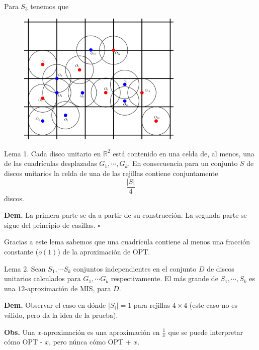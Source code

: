 \begin{frame}
  Para $S_3$ tenemos que
  \begin{figure}  
    \centering
    \includegraphics[width=0.7\textwidth]{./Images/R3.png}
  \end{figure}
\end{frame}

\begin{frame}
  \begin{block}{Lema 1.}
    Cada disco unitario en $\mathbb{R}^2$ está contenido en una celda de, al menos, una de las
    cuadrículas desplazadas $G_1, \dotsm, G_k$. En consecuencia para un conjunto $S$ de discos
    unitarios la celda de una de las rejillas contiene conjuntamente
    \[\frac{|S|}{4}\]
    discos.
  \end{block}
  \textbf{Dem.} La primera parte se da a partir de su construcción. La segunda parte se sigue
  del principio de casillas. \hfill $\square$\newline

  Gracias a este lema sabemos que una cuadrícula contiene al menos una fracción constante
  ($o(1)$) de la aproximación de OPT.
\end{frame}


\begin{frame}
  \begin{block}{Lema 2.}
    Sean $S_1, \dotsm S_k$ conjuntos independientes en el conjunto $D$ de discos unitarios
    calculados para $G_1, \dotsm G_k$ respectivamente. El más grande de $S_1, \dotsm,S_k$
    es una $12$-aproximación de MIS, para $D$.
  \end{block}
  \textbf{Dem.} Observar el caso en dónde $|S_i| = 1$ para rejillas $4 \times 4$ (este caso
  no es válido, pero da la idea de la prueba).\newline

  \textbf{Obs.} Una $x$-aproximación es una aproximación en $\frac{1}{x}$ que se puede
  interpretar cómo OPT - $x$, pero núnca cómo OPT + $x$.
\end{frame}
